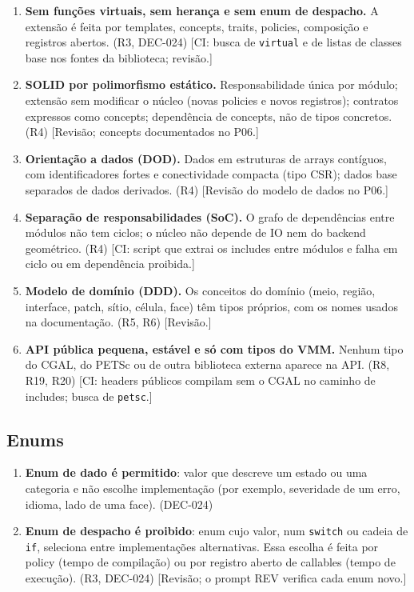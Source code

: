 \begin{enumerate}
  \item \textbf{Sem funções virtuais, sem herança e sem enum de despacho.} A extensão é feita por templates,
        concepts, traits, policies, composição e registros abertos. (R3, DEC-024)
        [CI: busca de \texttt{virtual} e de listas de classes base nos fontes da biblioteca; revisão.]
  \item \textbf{SOLID por polimorfismo estático.} Responsabilidade única por módulo; extensão sem modificar o
        núcleo (novas policies e novos registros); contratos expressos como concepts; dependência de concepts, não
        de tipos concretos. (R4)
        [Revisão; concepts documentados no P06.]
  \item \textbf{Orientação a dados (DOD).} Dados em estruturas de arrays contíguos, com identificadores fortes e
        conectividade compacta (tipo CSR); dados base separados de dados derivados. (R4)
        [Revisão do modelo de dados no P06.]
  \item \textbf{Separação de responsabilidades (SoC).} O grafo de dependências entre módulos não tem ciclos; o
        núcleo não depende de IO nem do backend geométrico. (R4)
        [CI: script que extrai os includes entre módulos e falha em ciclo ou em dependência proibida.]
  \item \textbf{Modelo de domínio (DDD).} Os conceitos do domínio (meio, região, interface, patch, sítio,
        célula, face) têm tipos próprios, com os nomes usados na documentação. (R5, R6)
        [Revisão.]
  \item \textbf{API pública pequena, estável e só com tipos do VMM.} Nenhum tipo do CGAL, do PETSc ou de outra
        biblioteca externa aparece na API. (R8, R19, R20)
        [CI: headers públicos compilam sem o CGAL no caminho de includes; busca de \texttt{petsc}.]
\end{enumerate}

\subsection{Enums}

\begin{enumerate}
  \item \textbf{Enum de dado é permitido}: valor que descreve um estado ou uma categoria e não escolhe
        implementação (por exemplo, severidade de um erro, idioma, lado de uma face). (DEC-024)
  \item \textbf{Enum de despacho é proibido}: enum cujo valor, num \texttt{switch} ou cadeia de \texttt{if},
        seleciona entre implementações alternativas. Essa escolha é feita por policy (tempo de compilação) ou por
        registro aberto de callables (tempo de execução). (R3, DEC-024)
        [Revisão; o prompt REV verifica cada enum novo.]
\end{enumerate}

